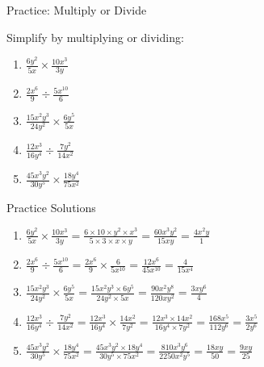 \documentclass[aspectratio=169]{beamer}
\begin{document}
\begin{frame}{Practice: Multiply or Divide}
\begin{tcolorbox}[colback=lightgray,colframe=primary,title=Practice Problems]
\footnotesize
Simplify by multiplying or dividing:
\begin{enumerate}
  \item $\frac{6y^2}{5x} \times \frac{10x^3}{3y}$
  \item $\frac{2x^6}{9} \div \frac{5x^{10}}{6}$
  \item $\frac{15x^2 y^3}{24y^2} \times \frac{6y^5}{5x}$
  \item $\frac{12x^3}{16y^4} \div \frac{7y^2}{14x^2}$
  \item $\frac{45x^3 y^2}{30y^5} \times \frac{18y^4}{75x^2}$
\end{enumerate}
\end{tcolorbox}
\end{frame}

\begin{frame}{Practice Solutions}
\begin{tcolorbox}[colback=lightgray,colframe=accent,title=Detailed Solutions]
\footnotesize
\begin{enumerate}
  \item $\frac{6y^2}{5x} \times \frac{10x^3}{3y} = \frac{6 \times 10 \times y^2 \times x^3}{5 \times 3 \times x \times y} = \frac{60x^3 y^2}{15x y} = \frac{4x^2 y}{1}$
  \item $\frac{2x^6}{9} \div \frac{5x^{10}}{6} = \frac{2x^6}{9} \times \frac{6}{5x^{10}} = \frac{12x^6}{45x^{10}} = \frac{4}{15x^4}$
  \item $\frac{15x^2 y^3}{24y^2} \times \frac{6y^5}{5x} = \frac{15x^2 y^3 \times 6y^5}{24y^2 \times 5x} = \frac{90x^2 y^8}{120x y^2} = \frac{3x y^6}{4}$
  \item $\frac{12x^3}{16y^4} \div \frac{7y^2}{14x^2} = \frac{12x^3}{16y^4} \times \frac{14x^2}{7y^2} = \frac{12x^3 \times 14x^2}{16y^4 \times 7y^2} = \frac{168x^5}{112y^6} = \frac{3x^5}{2y^6}$
  \item $\frac{45x^3 y^2}{30y^5} \times \frac{18y^4}{75x^2} = \frac{45x^3 y^2 \times 18y^4}{30y^5 \times 75x^2} = \frac{810x^3 y^6}{2250x^2 y^5} = \frac{18x y}{50} = \frac{9x y}{25}$
\end{enumerate}
\end{tcolorbox}
\end{frame}
\end{document}
